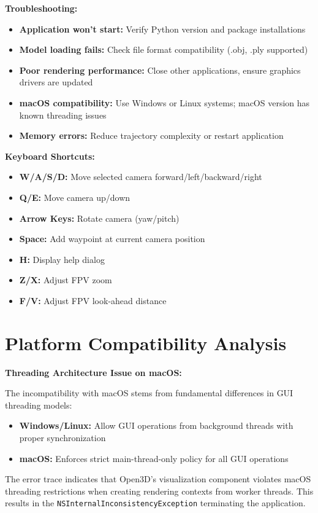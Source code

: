 \documentclass[11pt,a4paper]{article}
\begin{document}
\textbf{Troubleshooting:}
\begin{itemize}
\item \textbf{Application won't start:} Verify Python version and package installations
\item \textbf{Model loading fails:} Check file format compatibility (.obj, .ply supported)
\item \textbf{Poor rendering performance:} Close other applications, ensure graphics drivers are updated
\item \textbf{macOS compatibility:} Use Windows or Linux systems; macOS version has known threading issues
\item \textbf{Memory errors:} Reduce trajectory complexity or restart application
\end{itemize}

\textbf{Keyboard Shortcuts:}
\begin{itemize}
\item \textbf{W/A/S/D:} Move selected camera forward/left/backward/right
\item \textbf{Q/E:} Move camera up/down
\item \textbf{Arrow Keys:} Rotate camera (yaw/pitch)
\item \textbf{Space:} Add waypoint at current camera position
\item \textbf{H:} Display help dialog
\item \textbf{Z/X:} Adjust FPV zoom
\item \textbf{F/V:} Adjust FPV look-ahead distance
\end{itemize}

\section{Platform Compatibility Analysis}

\textbf{Threading Architecture Issue on macOS:}

The incompatibility with macOS stems from fundamental differences in GUI threading models:

\begin{itemize}
\item \textbf{Windows/Linux:} Allow GUI operations from background threads with proper synchronization
\item \textbf{macOS:} Enforces strict main-thread-only policy for all GUI operations
\end{itemize}

The error trace indicates that Open3D's visualization component violates macOS threading restrictions when creating rendering contexts from worker threads. This results in the \texttt{NSInternalInconsistencyException} terminating the application.
\end{document}
